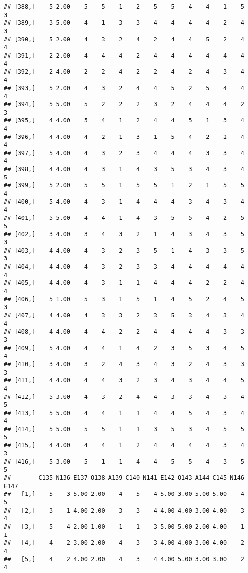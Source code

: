 \documentclass[]{article}
\begin{document}
\begin{verbatim}
## [388,]    5 2.00    5    5    1    2    5    5    4    4    1    5    3
## [389,]    3 5.00    4    1    3    3    4    4    4    4    2    4    3
## [390,]    5 2.00    4    3    2    4    2    4    4    5    2    4    4
## [391,]    2 2.00    4    4    4    2    4    4    4    4    4    4    4
## [392,]    2 4.00    2    2    4    2    2    4    2    4    3    4    4
## [393,]    5 2.00    4    3    2    4    4    5    2    5    4    4    4
## [394,]    5 5.00    5    2    2    2    3    2    4    4    4    2    3
## [395,]    4 4.00    5    4    1    2    4    4    5    1    3    4    4
## [396,]    4 4.00    4    2    1    3    1    5    4    2    2    4    4
## [397,]    5 4.00    4    3    2    3    4    4    4    3    3    4    4
## [398,]    4 4.00    4    3    1    4    3    5    3    4    3    4    5
## [399,]    5 2.00    5    5    1    5    5    1    2    1    5    5    4
## [400,]    5 4.00    4    3    1    4    4    4    3    4    3    4    4
## [401,]    5 5.00    4    4    1    4    3    5    5    4    2    5    5
## [402,]    3 4.00    3    4    3    2    1    4    3    4    3    5    3
## [403,]    4 4.00    4    3    2    3    5    1    4    3    3    5    3
## [404,]    4 4.00    4    3    2    3    3    4    4    4    4    4    4
## [405,]    4 4.00    4    3    1    1    4    4    4    2    2    4    4
## [406,]    5 1.00    5    3    1    5    1    4    5    2    4    5    3
## [407,]    4 4.00    4    3    3    2    3    5    3    4    3    4    4
## [408,]    4 4.00    4    4    2    2    4    4    4    4    3    3    3
## [409,]    5 4.00    4    4    1    4    2    3    5    3    4    5    4
## [410,]    3 4.00    3    2    4    3    4    3    2    4    3    3    3
## [411,]    4 4.00    4    4    3    2    3    4    3    4    4    5    4
## [412,]    5 3.00    4    3    2    4    4    3    3    4    3    4    5
## [413,]    5 5.00    4    4    1    1    4    4    5    4    3    4    4
## [414,]    5 5.00    5    5    1    1    3    5    3    4    5    5    5
## [415,]    4 4.00    4    4    1    2    4    4    4    4    3    4    3
## [416,]    5 3.00    5    1    1    4    4    5    5    4    3    5    5
##        C135 N136 E137 O138 A139 C140 N141 E142 O143 A144 C145 N146 E147
##   [1,]    5    3 5.00 2.00    4    5    4 5.00 3.00 5.00 5.00    4    5
##   [2,]    3    1 4.00 2.00    3    3    4 4.00 4.00 3.00 4.00    3    4
##   [3,]    5    4 2.00 1.00    1    1    3 5.00 5.00 2.00 4.00    1    1
##   [4,]    4    2 3.00 2.00    4    3    3 4.00 4.00 3.00 4.00    2    4
##   [5,]    4    2 4.00 2.00    4    3    4 4.00 5.00 3.00 3.00    2    4

\end{verbatim}
\end{document}
